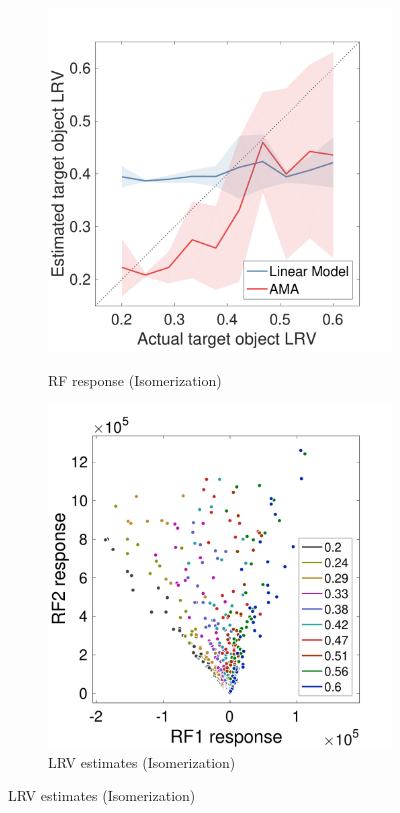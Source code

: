 \documentclass{jov}
\begin{document}
\begin{figure}
\centering
    \begin{subfigure}[b]{0.22\textwidth}   
        \caption{RF response (Isomerization)}
        \includegraphics[width=\textwidth]{../FiguresDraft4/Figure11/Figure11_a.pdf}
        \label{fig:case2IsomerizationEstimates}
    \end{subfigure}
        \begin{subfigure}[b]{0.22 \textwidth}
        \caption{LRV estimates (Isomerization)}
        \includegraphics[width=\textwidth]{../FiguresDraft4/Figure11/Figure11_b.pdf}

\end{subfigure}
\end{figure}
\end{document}
